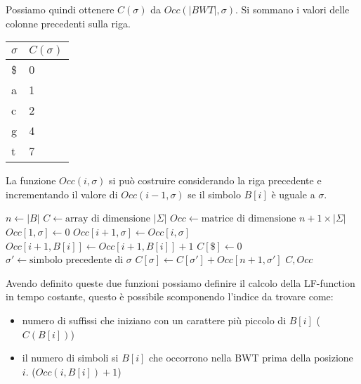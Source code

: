 \begin{esempio}
    Possiamo quindi ottenere $C(\sigma)$ da $Occ(|BWT|,\sigma)$. Si sommano i valori
    delle colonne precedenti sulla riga.
    \begin{table}[!ht]
        \centering
        \begin{tabular}{|l|l|}
            \hline
            $\sigma$ & $C(\sigma)$ \\ \hline
            \$       & 0           \\ \hline
            a        & 1           \\ \hline
            c        & 2           \\ \hline
            g        & 4           \\ \hline
            t        & 7           \\ \hline
        \end{tabular}
    \end{table}
\end{esempio}
La funzione $Occ(i, \sigma)$ si può costruire considerando la riga precedente e
incrementando il valore di $Occ(i - 1, \sigma)$ se il simbolo $B[i]$ è
uguale a $\sigma$.

\begin{algorithm}
    \begin{algorithmic}
        \State $n \gets |B|$
        \State $C \gets \text{array di dimensione } |\Sigma|$
        \State $Occ \gets \text{matrice di dimensione } n + 1 \times |\Sigma|$
        \For{$\sigma$}
        \State $Occ[1, \sigma] \gets 0$
        \EndFor
        \State $Occ[i + 1, \sigma] \gets Occ[i, \sigma]$
        \EndFor
        \State $Occ[i + 1, B[i]] \gets Occ[i + 1, B[i]] + 1$
        \EndFor
        \State $C[\$] \gets 0$
        \State $\sigma' \gets \text{simbolo precedente di } \sigma$
        \State $C[\sigma] \gets C[\sigma'] + Occ[n + 1, \sigma']$
        \EndFor
        \State \Return $C, Occ$
        \EndFunction
    \end{algorithmic}
\end{algorithm}

Avendo definito queste due funzioni possiamo definire il calcolo della LF-function
in tempo costante, questo è possibile scomponendo l'indice da trovare come:
\begin{itemize}
    \item numero di suffissi che iniziano con un carattere
          più piccolo di $B[i]$ ($C(B[i])$)
    \item il numero di simboli si $B[i]$ che occorrono nella
          BWT prima della posizione $i$. ($Occ(i, B[i]) + 1$)
\end{itemize}

